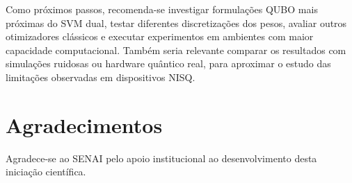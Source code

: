 \documentclass[12pt]{unisenaiclass}
\begin{document}
Como próximos passos, recomenda-se investigar formulações QUBO mais próximas do SVM dual, testar diferentes discretizações dos pesos, avaliar outros otimizadores clássicos e executar experimentos em ambientes com maior capacidade computacional. Também seria relevante comparar os resultados com simulações ruidosas ou hardware quântico real, para aproximar o estudo das limitações observadas em dispositivos NISQ.

\section*{Agradecimentos}
Agradece-se ao SENAI pelo apoio institucional ao desenvolvimento desta iniciação científica.

\clearpage

\printbibliography
\end{document}
